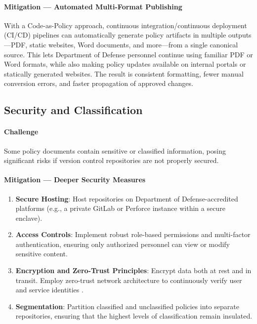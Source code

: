 \documentclass[11pt]{article}
\begin{document}
	\paragraph{Mitigation --- Automated Multi-Format Publishing}
	With a Code-as-Policy approach, continuous integration/continuous deployment (CI/CD) pipelines can automatically generate policy artifacts in multiple outputs---PDF, static websites, Word documents, and more---from a single canonical source. This lets Department of Defense personnel continue using familiar PDF or Word formats, while also making policy updates available on internal portals or statically generated websites. The result is consistent formatting, fewer manual conversion errors, and faster propagation of approved changes.

	\subsection{Security and Classification}
	\paragraph{Challenge}
	Some policy documents contain sensitive or classified information, posing significant risks if version control repositories are not properly secured.

	\paragraph{Mitigation --- Deeper Security Measures}
	\begin{enumerate}
		\item \textbf{Secure Hosting}: Host repositories on Department of Defense-accredited platforms (e.g., a private GitLab or Perforce instance within a secure enclave).
		\item \textbf{Access Controls}: Implement robust role-based permissions and multi-factor authentication, ensuring only authorized personnel can view or modify sensitive content.
		\item \textbf{Encryption and Zero-Trust Principles}: Encrypt data both at rest and in transit. Employ zero-trust network architecture to continuously verify user and service identities \cite{NIST80053}.
		\item \textbf{Segmentation}: Partition classified and unclassified policies into separate repositories, ensuring that the highest levels of classification remain insulated.
	\end{enumerate}
\end{document}
